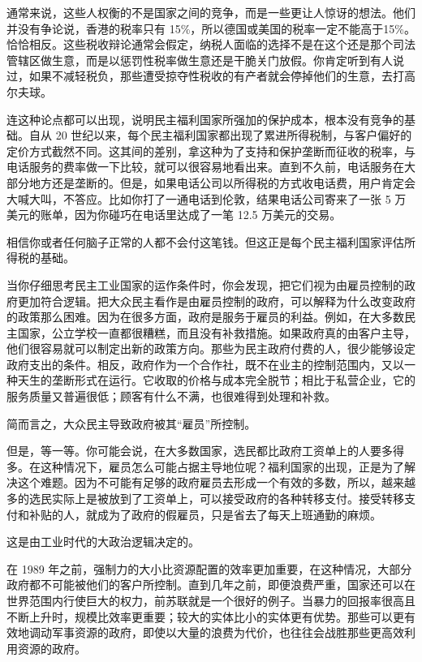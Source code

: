 通常来说，这些人权衡的不是国家之间的竞争，而是一些更让人惊讶的想法。他们并没有争论说，香港的税率只有 15\%，所以德国或美国的税率一定不能高于15\%。恰恰相反。这些税收辩论通常会假定，纳税人面临的选择不是在这个还是那个司法管辖区做生意，而是以惩罚性税率做生意还是干脆关门放假。你肯定听到有人说过，如果不减轻税负，那些遭受掠夺性税收的有产者就会停掉他们的生意，去打高尔夫球。

连这种论点都可以出现，说明民主福利国家所强加的保护成本，根本没有竞争的基础。自从 20 世纪以来，每个民主福利国家都出现了累进所得税制，与客户偏好的定价方式截然不同。这其间的差别，拿这种为了支持和保护垄断而征收的税率，与电话服务的费率做一下比较，就可以很容易地看出来。直到不久前，电话服务在大部分地方还是垄断的。但是，如果电话公司以所得税的方式收电话费，用户肯定会大喊大叫，不答应。比如你打了一通电话到伦敦，结果电话公司寄来了一张 5 万美元的账单，因为你碰巧在电话里达成了一笔 12.5 万美元的交易。

相信你或者任何脑子正常的人都不会付这笔钱。但这正是每个民主福利国家评估所得税的基础。

当你仔细思考民主工业国家的运作条件时，你会发现，把它们视为由雇员控制的政府更加符合逻辑。把大众民主看作是由雇员控制的政府，可以解释为什么改变政府的政策那么困难。因为在很多方面，政府是服务于雇员的利益。例如，在大多数民主国家，公立学校一直都很糟糕，而且没有补救措施。如果政府真的由客户主导，他们很容易就可以制定出新的政策方向。那些为民主政府付费的人，很少能够设定政府支出的条件。相反，政府作为一个合作社，既不在业主的控制范围内，又以一种天生的垄断形式在运行。它收取的价格与成本完全脱节；相比于私营企业，它的服务质量又普遍很低；顾客有什么不满，也很难得到处理和补救。

简而言之，大众民主导致政府被其“雇员”所控制。

但是，等一等。你可能会说，在大多数国家，选民都比政府工资单上的人要多得多。在这种情况下，雇员怎么可能占据主导地位呢？福利国家的出现，正是为了解决这个难题。因为不可能有足够的政府雇员去形成一个有效的多数，所以，越来越多的选民实际上是被放到了工资单上，可以接受政府的各种转移支付。接受转移支付和补贴的人，就成为了政府的假雇员，只是省去了每天上班通勤的麻烦。

这是由工业时代的大政治逻辑决定的。

在 1989 年之前，强制力的大小比资源配置的效率更加重要，在这种情况，大部分政府都不可能被他们的客户所控制。直到几年之前，即便浪费严重，国家还可以在世界范围内行使巨大的权力，前苏联就是一个很好的例子。当暴力的回报率很高且不断上升时，规模比效率更重要；较大的实体比小的实体更有优势。那些可以更有效地调动军事资源的政府，即使以大量的浪费为代价，也往往会战胜那些更高效利用资源的政府。

